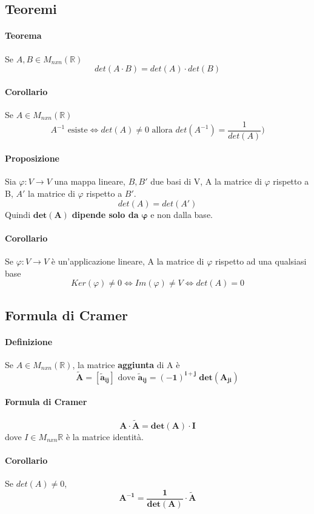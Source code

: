 \documentclass[a4paper, 12pt]{report}
\begin{document}
    \subsection{Teoremi}
    \paragraph{Teorema} Se $A,B \in M_{nxn}(\mathbb{R})$ $$det(A \cdot B)= det(A) \cdot det(B)$$  
    \paragraph{Corollario} Se $A \in M_{nxn}(\mathbb{R})$ $$A^{-1} \text{ esiste} \Leftrightarrow det(A)\neq 0 \text{ allora } det(A^{-1})=\frac{1}{det(A)})$$
    \paragraph{Proposizione} Sia $\varphi: V \rightarrow V$ una mappa lineare, $B,B'$ due basi di V, A la matrice di $\varphi$ rispetto a B, $A'$ la matrice di $\varphi$ rispetto a $B'$.
    $$det(A)=det(A')$$
    Quindi $\boldsymbol{det(A)}$ \textbf{dipende solo da} $\boldsymbol{\varphi}$ e non dalla base.
    \paragraph{Corollario} Se $\varphi: V \rightarrow V$ è un'applicazione lineare, A la matrice di $\varphi$ rispetto ad una qualsiasi base
    $$Ker(\varphi)\neq 0 \Leftrightarrow Im(\varphi)\neq V \Leftrightarrow det(A)=0$$
    \subsection{Formula di Cramer}
    \paragraph{Definizione} Se $A \in M_{nxn}(\mathbb{R})$, la matrice \textbf{aggiunta} di A è $$\boldsymbol{\tilde{A}=[\tilde{a}_{ij}]} \text{ dove }
    \boldsymbol{\tilde{a}_{ij}=(-1)^{i+j} \; det(A_{ji})}$$ 
    \paragraph{Formula di Cramer}$$\boldsymbol{A \cdot \tilde{A}=det(A) \cdot I}$$
    dove $I \in M_{nxn}\mathbb{R}$ è la matrice identità.
    \paragraph{Corollario} Se $det(A)\neq 0$,$$\boldsymbol{A^{-1}= \frac{1}{det(A)}\cdot \tilde{A}}$$
\end{document}
